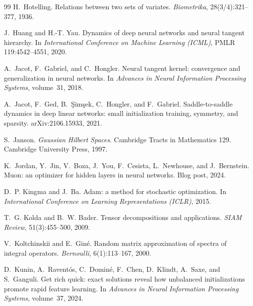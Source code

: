 \documentclass[11pt]{article}
\theoremstyle{definition}
\numberwithin{equation}{section}
\begin{document}
\begin{thebibliography}{99}
H.~Hotelling.
\newblock Relations between two sets of variates.
\newblock \emph{Biometrika}, 28(3/4):321--377, 1936.

J.~Huang and H.-T. Yau.
\newblock Dynamics of deep neural networks and neural tangent hierarchy.
\newblock In \emph{International Conference on Machine Learning (ICML)}, PMLR 119:4542--4551, 2020.

A.~Jacot, F.~Gabriel, and C.~Hongler.
\newblock Neural tangent kernel: convergence and generalization in neural networks.
\newblock In \emph{Advances in Neural Information Processing Systems}, volume~31, 2018.

A.~Jacot, F.~Ged, B.~\c{S}im\c{s}ek, C.~Hongler, and F.~Gabriel.
\newblock Saddle-to-saddle dynamics in deep linear networks: small initialization training, symmetry, and sparsity.
\newblock arXiv:2106.15933, 2021.

S.~Janson.
\newblock \emph{Gaussian Hilbert Spaces}.
\newblock Cambridge Tracts in Mathematics 129. Cambridge University Press, 1997.

K.~Jordan, Y.~Jin, V.~Boza, J.~You, F.~Cesista, L.~Newhouse, and J.~Bernstein.
\newblock Muon: an optimizer for hidden layers in neural networks.
\newblock Blog post, 2024.

D.~P. Kingma and J.~Ba.
\newblock Adam: a method for stochastic optimization.
\newblock In \emph{International Conference on Learning Representations (ICLR)}, 2015.

T.~G. Kolda and B.~W. Bader.
\newblock Tensor decompositions and applications.
\newblock \emph{SIAM Review}, 51(3):455--500, 2009.

V.~Koltchinskii and E.~Gin\'e.
\newblock Random matrix approximation of spectra of integral operators.
\newblock \emph{Bernoulli}, 6(1):113--167, 2000.

D.~Kunin, A.~Ravent\'os, C.~Domin\'e, F.~Chen, D.~Klindt, A.~Saxe, and S.~Ganguli.
\newblock Get rich quick: exact solutions reveal how unbalanced initializations promote rapid feature learning.
\newblock In \emph{Advances in Neural Information Processing Systems}, volume~37, 2024.


\end{thebibliography}
\end{document}
